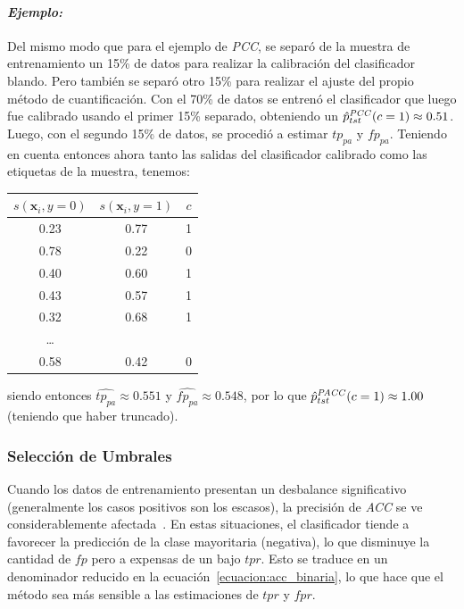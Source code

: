 \paragraph{\it Ejemplo:\/} Del mismo modo que para el ejemplo de {\it PCC}, se
separó de la muestra de entrenamiento un 15\% de datos para realizar la
calibración del clasificador blando. Pero también se separó otro 15\% para
realizar el ajuste del propio método de cuantificación. Con el 70\% de datos se
entrenó el clasificador que luego fue calibrado usando el primer 15\% separado,
obteniendo un \(\hat p^{\it PCC\/}_{tst}(c=1) \approx 0.51\). Luego, con el
segundo 15\% de datos, se procedió a estimar \(tp_{pa}\) y \(fp_{pa}\). Teniendo
en cuenta entonces ahora tanto las salidas del clasificador calibrado como las
etiquetas de la muestra, tenemos:
\begin{center}
    \begin{tabular}{ccc}
        \toprule
        \(s(\boldsymbol{x}_i, y=0)\) &  \(s(\boldsymbol{x}_i, y=1)\) & \(c\) \\
        \midrule
        0.23 &    0.77 &  1 \\
        0.78 &    0.22 &  0 \\
        0.40 &    0.60 &  1 \\
        0.43 &    0.57 &  1 \\
        0.32 &    0.68 &  1 \\
        \ldots              \\
        0.58 &    0.42 &  0 \\
     \bottomrule
        \bottomrule
        \end{tabular}
\end{center}

siendo entonces \(\hat{tp_{pa}} \approx 0.551\) y \(\hat{fp_{pa}} \approx
0.548\), por lo que \(\hat p^{\it PACC\/}_{tst}(c=1) \approx 1.00\) (teniendo
que haber truncado).

\subsubsection{Selección de Umbrales}\label{estimacion:umbrales}

Cuando los datos de entrenamiento presentan un desbalance significativo
(generalmente los casos positivos son los escasos), la precisión de {\it ACC\/}
se ve considerablemente afectada~\cite{forman2006quantifying}. En estas
situaciones, el clasificador tiende a favorecer la predicción de la clase
mayoritaria (negativa), lo que disminuye la cantidad de \(fp\) pero a expensas
de un bajo \(tpr\). Esto se traduce en un denominador reducido en la
ecuación~\ref{ecuacion:acc_binaria}, lo que hace que el método sea más sensible
a las estimaciones de \(tpr\) y \(fpr\).

